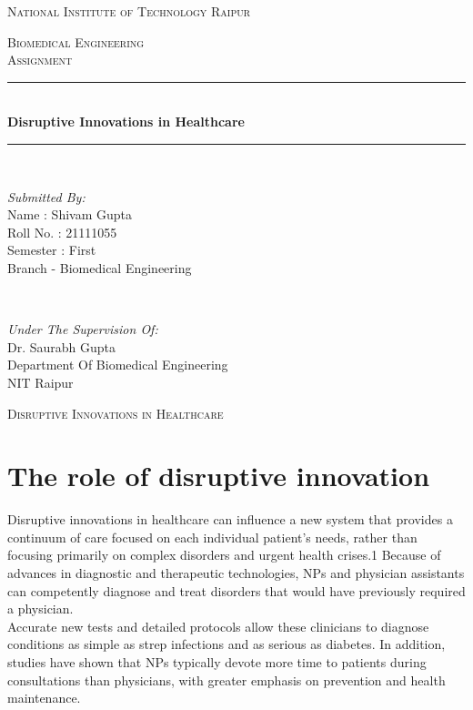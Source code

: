 \documentclass[12pt]{article}
\begin{document}
\begin{titlepage}
\newcommand{\HRule}{\rule{\linewidth}{0.5mm}}
\center
\textsc{\LARGE National Institute of Technology Raipur}\\[1.0cm]
\begin{figure}[h]
\centering
\end{figure}
\textsc{\Large Biomedical Engineering}\\[0.5cm] 
\textsc{\large Assignment}\\[0.5cm]
\HRule\\[0.4cm]
	
	{\huge\bfseries Disruptive Innovations in Healthcare}\\[0.1cm]
	\HRule\\[1.1cm]
	\begin{minipage}{0.4\textwidth}
		\begin{flushleft}
			\large
			\textit{Submitted By:}\\
          		Name : Shivam Gupta \\
			   Roll No. : 21111055\\
			   Semester : First\\
			   Branch - Biomedical Engineering 
			   
			\end{flushleft}
	\end{minipage}
	~
	\begin{minipage}{0.5\textwidth}
		\begin{flushright}
			\large
			\textit{Under The Supervision Of:}\\
			Dr. Saurabh Gupta\\
			Department Of Biomedical Engineering\\
			NIT Raipur
		\end{flushright}
	\end{minipage}
	\vfill\vfill\vfill 
	
	
	\vfill 
\end{titlepage}


\clearpage
\newpage
\textsc{\Large Disruptive Innovations in Healthcare}\\[0.1cm]


\section*{The role of disruptive innovation}
Disruptive innovations in healthcare can influence a new system that provides a continuum of care focused on each individual patient's needs, rather than focusing primarily on complex disorders and urgent health crises.1 Because of advances in diagnostic and therapeutic technologies, NPs and physician assistants can competently diagnose and treat disorders that would have previously required a physician.\\
\linebreak
Accurate new tests and detailed protocols allow these clinicians to diagnose conditions as simple as strep infections and as serious as diabetes. In addition, studies have shown that NPs typically devote more time to patients during consultations than physicians, with greater emphasis on prevention and health maintenance.
\end{document}
